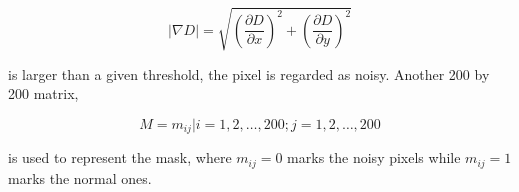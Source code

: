 \begin{equation}
|\nabla D|=\sqrt{
\left(\frac{\partial{D}}{\partial{x}}\right)^2 +
\left(\frac{\partial{D}}{\partial{y}}\right)^2
}
\end{equation}

is larger than a given threshold, the pixel is regarded as noisy. Another 200 by 200 matrix,

\begin{equation}
\label{eq:methodology:roimask}
M=m_{ij}|i=1,2,\dots,200;j=1,2,\dots,200
\end{equation}

is used to represent the mask, where $m_{ij}=0$ marks the noisy pixels while $m_{ij}=1$ marks the normal ones.